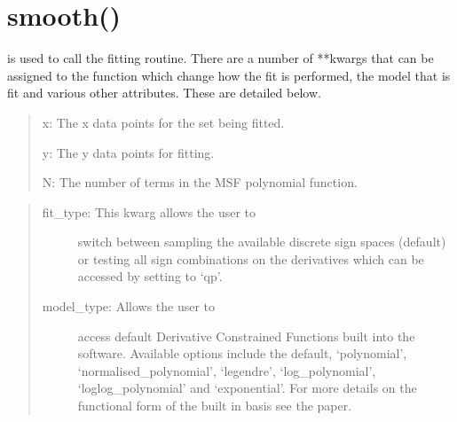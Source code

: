 \documentclass[letterpaper,10pt,english]{sphinxmanual}
\begin{document}
\section{smooth()}
\label{\detokenize{source/maxsmooth:smooth}}\label{\detokenize{source/maxsmooth:module-maxsmooth.DCF}}
 is used to call the fitting routine. There are a number
of **kwargs that can be assigned to the function which change how the fit is
performed, the model that is fit and  various other attributes. These are
detailed below.

\begin{fulllineitems}
\label{\detokenize{source/maxsmooth:maxsmooth.DCF.smooth}}
\begin{quote}

x:  The x data points for the set being fitted.

y:  The y data points for fitting.

N:  The number of terms in the MSF polynomial function.
\end{quote}

\begin{quote}
\begin{description}
\item[{fit\_type:  This kwarg allows the user to}] \leavevmode
switch between sampling the available discrete sign spaces (default)
or testing all sign combinations on the derivatives which can be
accessed by setting to ‘qp’.

\item[{model\_type:  Allows the user to}] \leavevmode
access default Derivative Constrained Functions built into the
software. Available options include the default, ‘polynomial’,
‘normalised\_polynomial’, ‘legendre’, ‘log\_polynomial’,
‘loglog\_polynomial’ and ‘exponential’. For more details on the
functional form of the built in basis see the  paper.


\end{description}
\end{quote}
\end{fulllineitems}
\end{document}
